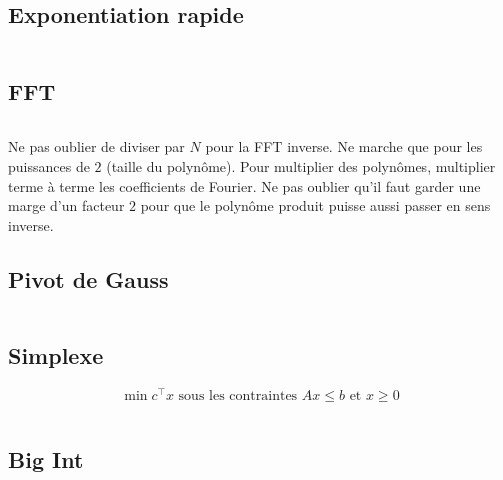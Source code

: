 \documentclass[10pt,twocolumn]{article}
\renewcommand{\geq}{\geqslant}
\renewcommand{\leq}{\leqslant}
\begin{document}
\subsection{Exponentiation rapide}
\inputminted[breaklines,tabsize=4]{cpp}{code/fastexp.cpp}

\subsection{FFT}
\inputminted[breaklines,tabsize=4]{cpp}{code/fft.cpp}
Ne pas oublier de diviser par $N$ pour la FFT inverse. Ne marche que pour les puissances de $2$ (taille du polynôme). Pour multiplier des polynômes, multiplier terme à terme  les coefficients de Fourier. Ne pas oublier qu'il faut garder une marge d'un facteur $2$ pour que le polynôme produit puisse aussi passer en sens inverse.

\subsection{Pivot de Gauss}
\inputminted[breaklines,tabsize=4]{cpp}{code/gauss.cpp}

\subsection{Simplexe}
$$
    \min c^\top x \text{ sous les contraintes } Ax \leq b \text{ et } x \geq 0
$$
\inputminted[breaklines,tabsize=4]{cpp}{code/simplex.cpp}

\subsection{Big Int}
\inputminted[breaklines,tabsize=4]{cpp}{code/bigint.cpp}
\end{document}
